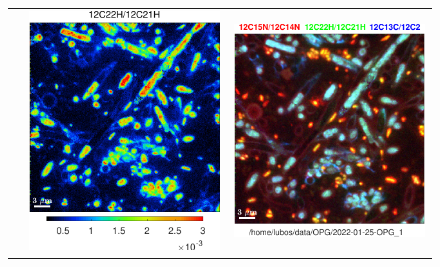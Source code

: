 \begin{figure}[!ht]
\begin{tabular}{ccc}
&
\includegraphics[scale=\scf, valign=t]{figs8/12C22H-12C21H}
&
\includegraphics[scale=\scf, valign=t]{figs8/12C15N-12C14N-vs-12C22H-12C21H-vs-12C13C-12C2-rgb}

\end{tabular}
\end{figure}
